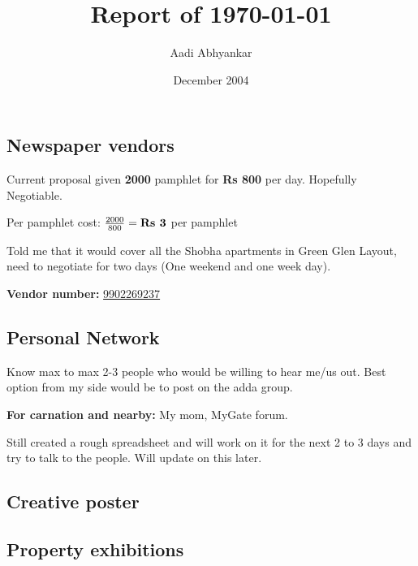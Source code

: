 \documentclass[12pt, a4paper]{article}
\begin{document}
\title{Report of \today}
\author{Aadi Abhyankar}
\date{December 2004}
\maketitle

\subsection{Newspaper vendors}

Current proposal given \textbf{2000} pamphlet for \textbf{Rs 800} per day. Hopefully Negotiable.

\vspace{0.5cm}

Per pamphlet cost: $\frac{2000}{800} = \textbf{Rs \the\numexpr 2000 / 800 \relax} $ per pamphlet

\bigskip

\noindent Told me that it would cover all the Shobha apartments in Green Glen Layout, need to negotiate for two days (One weekend and one week day).

\bigskip

\textbf{Vendor number:} \href{tel:+919902269237}{9902269237}

\subsection{Personal Network}

Know max to max 2-3 people who would be willing to hear me/us out. Best option from my side would be to post on the adda group.

\vspace{0.25cm}

\noindent \textbf{For carnation and nearby:} My mom, MyGate forum.

\vspace{0.25cm}

\noindent Still created a rough spreadsheet and will work on it for the next 2 to 3 days and try to talk to the people. Will update on this later.

\subsection{Creative poster}

\subsection{Property exhibitions}
\end{document}
